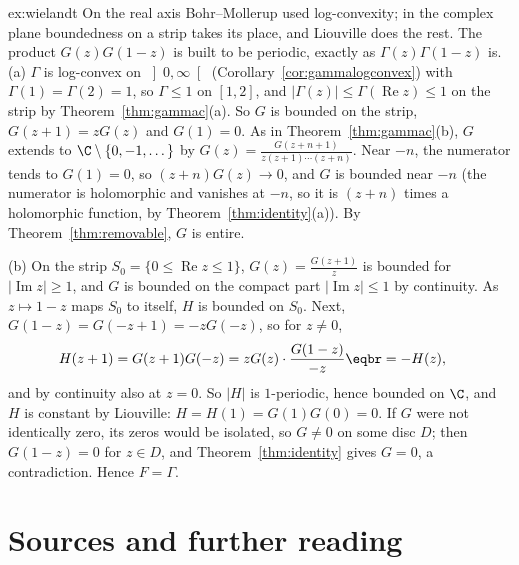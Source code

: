 \begin{solution}{ex:wielandt}
\idea On the real axis Bohr--Mollerup used log-convexity; in the complex plane boundedness on a strip takes its place, and
Liouville does the rest. The product $G(z)G(1-z)$ is built to be periodic, exactly as $\Gamma(z)\Gamma(1-z)$ is.
\writeup (a) $\Gamma$ is log-convex on $\left]0,\infty\right[$ (Corollary~\ref{cor:gammalogconvex}) with $\Gamma(1)=\Gamma(2)=1$, so $\Gamma\le1$ on $[1,2]$, and $|\Gamma(z)|\le\Gamma(\operatorname{Re}z)\le1$ on the
strip by Theorem~\ref{thm:gammac}(a). So $G$ is bounded on the strip, $G(z+1)=zG(z)$ and $G(1)=0$. As in Theorem~\ref{thm:gammac}(b), $G$ extends to
$\C\setminus\{0,-1,\dots\}$ by $G(z)=\frac{G(z+n+1)}{z(z+1)\cdots(z+n)}$. Near $-n$, the numerator tends to $G(1)=0$, so $(z+n)G(z)\to0$, and $G$ is bounded near $-n$ (the numerator is
holomorphic and vanishes at $-n$, so it is $(z+n)$ times a holomorphic function, by Theorem~\ref{thm:identity}(a)). By Theorem~\ref{thm:removable}, $G$ is entire.

(b) On the strip $S_0=\{0\le\operatorname{Re}z\le1\}$, $G(z)=\frac{G(z+1)}z$ is bounded for $|\operatorname{Im}z|\ge1$, and $G$ is bounded on the compact part $|\operatorname{Im}z|\le1$ by continuity.
As $z\mapsto1-z$ maps $S_0$ to itself, $H$ is bounded on $S_0$. Next, $G(1-z)=G(-z+1)=-zG(-z)$, so for $z\ne0$,
\[
\begin{aligned}H(z+1)&=G(z+1)G(-z)=zG(z)\cdot\frac{G(1-z)}{-z}\eqbr=-H(z),\end{aligned}
\]
and by continuity also at $z=0$. So $|H|$ is $1$-periodic, hence bounded on $\C$, and $H$ is constant by Liouville: $H=H(1)=G(1)G(0)=0$. If $G$ were not
identically zero, its zeros would be isolated, so $G\ne0$ on some disc $D$; then $G(1-z)=0$ for $z\in D$, and Theorem~\ref{thm:identity} gives $G=0$, a
contradiction. Hence $F=\Gamma$.
\end{solution}

\section*{Sources and further reading}

